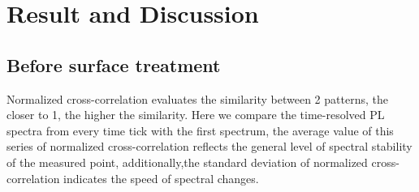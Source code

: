 \chapter{Result and Discussion} %

\label{Chapter2.75} %

\section{Before surface treatment}

Normalized cross-correlation evaluates the similarity between 2 patterns, the closer to 1, the higher the similarity. Here we compare the time-resolved PL spectra from every time tick with the first spectrum, the average value of this series of normalized cross-correlation reflects the general level of spectral stability of the measured point, additionally,the standard deviation of normalized cross-correlation indicates the speed of spectral changes.


